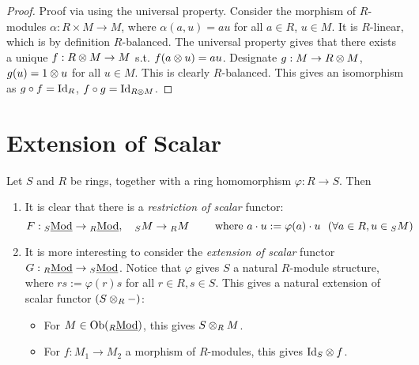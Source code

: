 \begin{proof}
    Proof via using the universal property. Consider the morphism of $R$-modules $\alpha: R \times M \to M$, where $\alpha(a, u) = au$ for all $a \in R$, $u \in M$. It is $R$-linear, which is by definition $R$-balanced. The universal property gives that there exists a unique $f: R \otimes M \to M$ s.t. $f(a \otimes u) = au$. Designate $g: M \to R \otimes M$, $g(u) = 1 \otimes u$ for all $u\in M$. This is clearly $R$-balanced. This gives an isomorphism as $g \circ f = \mathrm{Id}_R$, $f \circ g = \mathrm{Id}_{R \otimes M}$.
\end{proof}

\section{Extension of Scalar}

Let $S$ and $R$ be rings, together with a ring homomorphism $\varphi: R \to S$. Then 
\begin{enumerate}
    \item It is clear that there is a \emph{restriction of scalar} functor:
    \[
        F: \catlmod{S} \to \catlmod{R}, \quad _SM \to {_RM} \qquad \text{ where } a\cdot u := \varphi(a)\cdot u\ \ (\forall a\in R, u\in {_SM})
    \]
    \item It is more interesting to consider the \emph{extension of scalar} functor $G: {}_{R}\underline{\textup{Mod}} \to {}_{S}\underline{\textup{Mod}}$. Notice that $\varphi$ gives $S$ a natural $R$-module structure, where $rs := \varphi(r)s$ for all $r \in R, s\in S$. This gives a natural extension of scalar functor $(S \otimes_R -)$:
    \begin{itemize}
        \item For $M \in \mathrm{Ob}({}_{R}\underline{\textup{Mod}})$, this gives $S \otimes_R M$.
        \item For $f: M_1 \to M_2$ a morphism of $R$-modules, this gives $\mathrm{Id}_S \otimes f$.
    \end{itemize}
\end{enumerate}

